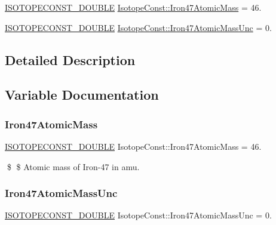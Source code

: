\begin{DoxyCompactItemize}
\item 
\mbox{\hyperlink{group___isotope_const-_macros_ga8f45a7272ce02c0b4c65c44636ed719a}{I\+S\+O\+T\+O\+P\+E\+C\+O\+N\+S\+T\+\_\+\+D\+O\+U\+B\+LE}} \mbox{\hyperlink{group___isotope_const-_iron-_fe47_ga4139e6af08aa5e3aa8b3150d99bb5a3d}{Isotope\+Const\+::\+Iron47\+Atomic\+Mass}} = 46.
\item 
\mbox{\hyperlink{group___isotope_const-_macros_ga8f45a7272ce02c0b4c65c44636ed719a}{I\+S\+O\+T\+O\+P\+E\+C\+O\+N\+S\+T\+\_\+\+D\+O\+U\+B\+LE}} \mbox{\hyperlink{group___isotope_const-_iron-_fe47_gadd214de707167fe2cb4ca20d2bb406d4}{Isotope\+Const\+::\+Iron47\+Atomic\+Mass\+Unc}} = 0.
\end{DoxyCompactItemize}


\subsection{Detailed Description}


\subsection{Variable Documentation}
\mbox{\label{group___isotope_const-_iron-_fe47_ga4139e6af08aa5e3aa8b3150d99bb5a3d}} 
\subsubsection{\texorpdfstring{Iron47\+Atomic\+Mass}{Iron47AtomicMass}}
{\footnotesize\ttfamily \mbox{\hyperlink{group___isotope_const-_macros_ga8f45a7272ce02c0b4c65c44636ed719a}{I\+S\+O\+T\+O\+P\+E\+C\+O\+N\+S\+T\+\_\+\+D\+O\+U\+B\+LE}} Isotope\+Const\+::\+Iron47\+Atomic\+Mass = 46.}

\$ \$ Atomic mass of Iron-\/47 in amu. \mbox{\label{group___isotope_const-_iron-_fe47_gadd214de707167fe2cb4ca20d2bb406d4}} 
\subsubsection{\texorpdfstring{Iron47\+Atomic\+Mass\+Unc}{Iron47AtomicMassUnc}}
{\footnotesize\ttfamily \mbox{\hyperlink{group___isotope_const-_macros_ga8f45a7272ce02c0b4c65c44636ed719a}{I\+S\+O\+T\+O\+P\+E\+C\+O\+N\+S\+T\+\_\+\+D\+O\+U\+B\+LE}} Isotope\+Const\+::\+Iron47\+Atomic\+Mass\+Unc = 0.}

